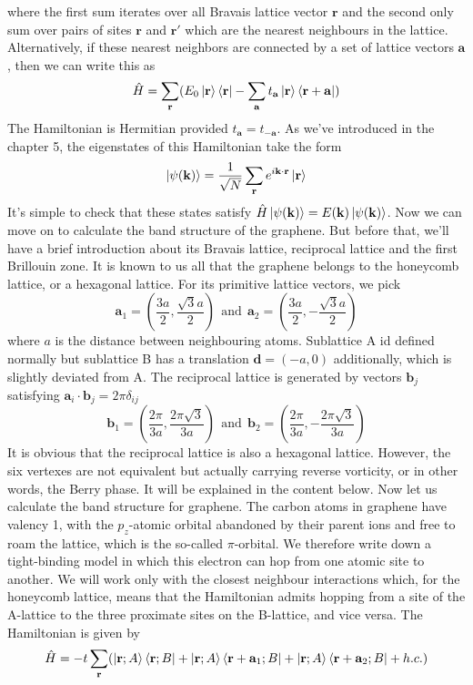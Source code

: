 \documentclass{article}
\begin{document}
where the first sum iterates over all Bravais lattice vector $\mathbf{r}$ and the second only sum over pairs of sites $\mathbf{r}$ and $\mathbf{r}'$ which are the nearest neighbours in the lattice. Alternatively, if these nearest neighbors are connected by a set of lattice vectors $\mathbf{a}$, then we can write this as\begin{equation}
    \hat{H}=\sum_{\mathbf{r}}(E_0\ket{\mathbf{r}}\bra{\mathbf{r}}-\sum_{\mathbf{a}}t_{\mathbf{a}}\ket{\mathbf{r}}\bra{\mathbf{r}+\mathbf{a}})
\end{equation}The Hamiltonian is Hermitian provided $t_{\mathbf{a}}=t_{-\mathbf{a}}$. As we've introduced in the chapter 5, the eigenstates of this Hamiltonian take the form\begin{equation}
    \ket{\psi(\mathbf{k})}=\frac{1}{\sqrt{N}}\sum_{\mathbf{r}}e^{i\mathbf{k}\cdot\mathbf{r}}\ket{\mathbf{r}}
\end{equation}It's simple to check that these states satisfy $\hat{H}\ket{\psi(\mathbf{k})}=E(\mathbf{k})\ket{\psi(\mathbf{k})}$. Now we can move on to calculate the band structure of the graphene. But before that, we'll have a brief introduction about its Bravais lattice, reciprocal lattice and the first Brillouin zone. It is known to us all that the graphene belongs to the honeycomb lattice, or a hexagonal lattice. For its primitive lattice vectors, we pick\begin{equation}
    \mathbf{a}_1=(\frac{3a}{2}, \frac{\sqrt{3}a}{2})~~\mathrm{and}~~\mathbf{a}_2=(\frac{3a}{2}, -\frac{\sqrt{3}a}{2})
\end{equation}
where $a$ is the distance between neighbouring atoms. Sublattice A id defined normally but sublattice B has a translation $\mathbf{d}=(-a,0)$ additionally, which is slightly deviated from A. The reciprocal lattice is generated by vectors $\mathbf{b}_j$ satisfying $\mathbf{a}_i\cdot\mathbf{b}_j=2\pi\delta_{ij}$\begin{equation}
    \mathbf{b}_1=(\frac{2\pi}{3a},\frac{2\pi\sqrt3}{3a})~~\mathrm{and}~~\mathbf{b}_2=(\frac{2\pi}{3a},-\frac{2\pi\sqrt3}{3a})
\end{equation}
It is obvious that the reciprocal lattice is also a hexagonal lattice. However, the six vertexes are not equivalent but actually carrying reverse vorticity, or in other words, the Berry phase. It will be explained in the content below. Now let us calculate the band structure for graphene. The carbon atoms in graphene have valency 1, with the $p_z$-atomic orbital abandoned by their parent ions and free to roam the lattice, which is the so-called $\pi$-orbital. We therefore write down a tight-binding model in which this electron can hop from one atomic site to another. We will work only with the closest neighbour interactions which, for the honeycomb lattice, means that the Hamiltonian admits hopping from a site of the A-lattice to the three proximate sites on the B-lattice, and vice versa. The Hamiltonian is given by\begin{equation}
    \hat{H}=-t\sum_{\mathbf{r}}(\ket{\mathbf{r};A}\bra{\mathbf{r};B}+\ket{\mathbf{r};A}\bra{\mathbf{r}+\mathbf{a}_1;B}+\ket{\mathbf{r};A}\bra{\mathbf{r}+\mathbf{a}_2;B}+h.c.)
\end{equation}
\end{document}
